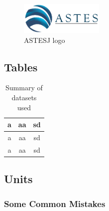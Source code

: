 \documentclass{article} %
\begin{document}
\begin{multicols}{2}
\begin{figure}[H]
	\centering
	\includegraphics[width=4cm]{images/ASTES_Logo.jpg}
	\caption{\footnotesize{ASTESJ logo}}    
	\label{astesj}
\end{figure}

\subsection{Tables}

\begin{table}[H]
	\centering
	\begin{tabular}{|c|c|c|}
	
		\hline
		
		a & aa & sd \\\hline
		a & aa & sd \\\hline
		a & aa & sd \\\hline
		
	\end{tabular}
	\caption{\footnotesize{Summary of datasets used}}
	\label{tab:veris}
\end{table}

\subsection{Units}

\subsubsection{ Some Common Mistakes}


\end{multicols}
\end{document}
